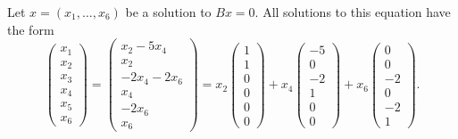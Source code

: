 \documentclass{ximera}
\begin{document}
\begin{exercise}
\begin{solution}
\soln Let $x = (x_1,\dots,x_6)$ be a solution to $Bx = 0$.  All solutions
to this equation have the form
\[
\left(\begin{array}{r} x_1 \\ x_2 \\ x_3 \\ x_4 \\ x_5 \\ x_6
\end{array}\right) =
\left(\begin{array}{c} x_2 - 5x_4 \\ x_2 \\ -2x_4 - 2x_6 \\ x_4 \\ -2x_6
\\ x_6 \end{array}\right) =
x_2\left(\begin{array}{r} 1 \\ 1 \\ 0 \\ 0 \\ 0 \\ 0 \end{array}\right) +
x_4\left(\begin{array}{r} -5 \\ 0 \\ -2 \\ 1 \\ 0 \\ 0 \end{array}\right) +
x_6\left(\begin{array}{r} 0 \\ 0 \\ -2 \\ 0 \\ -2 \\ 1 \end{array}\right).
\]


\end{solution}
\end{exercise}
\end{document}
